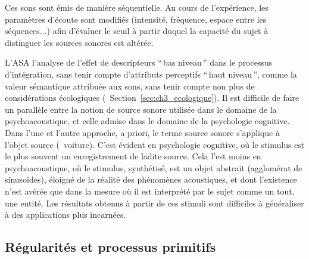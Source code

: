 Ces sons sont émis de manière séquentielle. Au cours de l'expérience, les paramètres d'écoute sont modifiés (intensité, fréquence, espace entre les séquences...) afin d'évaluer le seuil à partir duquel la capacité du sujet à distinguer les sources sonores est altérée.

L'ASA  l'analyse de l'effet de descripteurs ``\,bas niveau\,'' dans le processus d'intégration, sans tenir compte d'attributs perceptifs ``\,haut niveau\,'', comme la valeur sémantique attribuée aux sons, sans tenir compte non plus de considérations écologiques (\cf~Section~\ref{sec:ch3_ecologique}). Il est difficile de faire un parallèle entre la notion de source sonore utilisée dans le domaine de la psychoacoustique, et celle admise dans le domaine de la psychologie cognitive. Dans l'une et l'autre approche, a priori, le terme source sonore s'applique à l'objet source (\eg~voiture). C'est évident en psychologie cognitive, où le stimulus est le plus souvent un enregistrement de ladite source. Cela l'est moins en psychoacoustique, où le stimulus, synthétisé, est un objet abstrait (agglomérat de sinusoïdes), éloigné de la réalité des phénomènes acoustiques, et dont l'existence n'est avérée que dans la mesure où il est interprété par le sujet comme un tout, une entité. Les résultats obtenus à partir de ces stimuli sont difficiles à généraliser à des applications plus incarnées.

\subsection{Régularités et processus primitifs}
\label{sec:ch3_regularitesEtProcessusPrimitifs}


